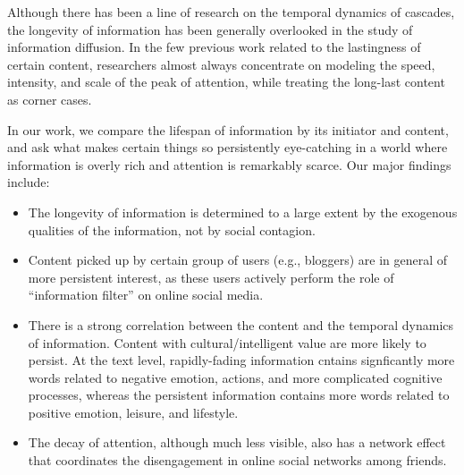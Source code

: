 \documentclass[phd,tocprelim]{cornell}
\begin{document}
Although there has been a line of research on the temporal dynamics of cascades\cite{Yang-2011,crane:2008,Leskovec:2005}, the longevity of information has been generally overlooked in the study of information diffusion. In the few previous work related to the lastingness of certain content\cite{crane:2008,Szabo-2010}, researchers almost always concentrate on modeling the speed, intensity, and scale of the peak of attention, while treating the long-last content as corner cases.

In our work, we compare the lifespan of information by its initiator and content, and ask what makes certain things so persistently eye-catching in a world where information is overly rich and attention is remarkably scarce\cite{Simon-1971}. Our major findings include:
\begin{itemize}
\item The longevity of information is determined to a large extent by the exogenous qualities of the information, not by social contagion. 
\item Content picked up by certain group of users (e.g., bloggers) are in general of more persistent interest, as these users actively perform the role of ``information filter'' on online social media.
\item There is a strong correlation between the content and the temporal dynamics of information. Content with cultural/intelligent value are more likely to persist. At the text level, rapidly-fading information cntains signficantly more words related to negative emotion, actions, and more complicated cognitive processes, whereas the persistent information contains more words related to positive emotion, leisure, and lifestyle.
\item The decay of attention, although much less visible, also has a network effect that coordinates the disengagement in online social networks among friends.
\end{itemize}
\end{document}
